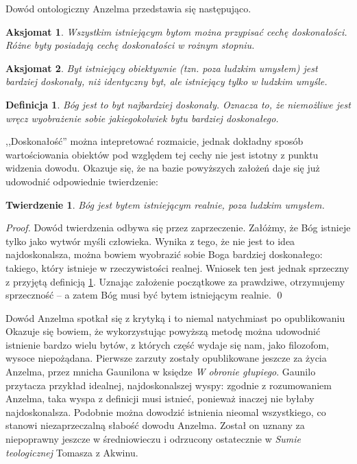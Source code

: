 \documentclass[
	runningheads
]{llncs}
\newtheorem{theorem-pl}{Twierdzenie}
\newtheorem{definition-pl}{Definicja}
\newtheorem{axiom-pl}{Aksjomat}
\begin{document}
Dowód ontologiczny Anzelma przedstawia się następująco. 
\begin{axiom-pl} \label{axiom:anzelm1}
	Wszystkim istniejącym bytom można przypisać cechę \emph{doskonałości}. Różne byty posiadają cechę doskonałości w rożnym stopniu. 
\end{axiom-pl}
\begin{axiom-pl} \label{axiom:anzelm2}
	Byt istniejący obiektywnie (tzn. poza ludzkim umysłem) jest bardziej doskonały, niż identyczny byt, ale istniejący tylko w ludzkim umyśle. 
\end{axiom-pl}
\begin{definition-pl} \label{def:anzelm-god}
	Bóg jest to byt najbardziej doskonały. Oznacza to, że niemożliwe jest wręcz \emph{wyobrażenie sobie} jakiegokolwiek bytu bardziej doskonałego. 
\end{definition-pl}
\noindent,,Doskonałość'' można intepretować rozmaicie, jednak dokładny sposób wartościowania obiektów pod względem tej cechy nie jest istotny z punktu widzenia dowodu. Okazuje się, że na bazie powyższych założeń daje się już udowodnić odpowiednie twierdzenie:
\begin{theorem-pl} \label{theorem:anzelm-god}
	Bóg jest bytem istniejącym realnie, poza ludzkim umysłem. 
\end{theorem-pl}
\begin{proof}
	Dowód twierdzenia odbywa się przez zaprzeczenie. Załóżmy, że Bóg istnieje tylko jako wytwór myśli człowieka. Wynika z tego, że nie jest to idea najdoskonalsza, można bowiem wyobrazić sobie Boga bardziej doskonałego: takiego, który istnieje w rzeczywistości realnej. Wniosek ten jest jednak sprzeczny z przyjętą definicją \ref{def:anzelm-god}. Uznając założenie początkowe za prawdziwe, otrzymujemy sprzeczność -- a zatem Bóg musi być bytem istniejącym realnie. 
	\qed
\end{proof}
Dowód Anzelma spotkał się z krytyką i to niemal natychmiast po opublikowaniu Okazuje się bowiem, że wykorzystując powyższą metodę można udowodnić istnienie bardzo wielu bytów, z których część wydaje się nam, jako filozofom, wysoce niepożądana. Pierwsze zarzuty zostały opublikowane jeszcze za życia Anzelma, przez mnicha Gaunilona w księdze \textit{W obronie głupiego}. Gaunilo przytacza przykład idealnej, najdoskonalszej wyspy: zgodnie z rozumowaniem Anzelma, taka wyspa z definicji musi istnieć, ponieważ inaczej nie byłaby najdoskonalsza. Podobnie można dowodzić istnienia nieomal wszystkiego, co stanowi niezaprzeczalną słabość dowodu Anzelma. Został on uznany za niepoprawny jeszcze w średniowieczu i odrzucony ostatecznie w \textit{Sumie teologicznej} Tomasza z Akwinu. 
\end{document}
